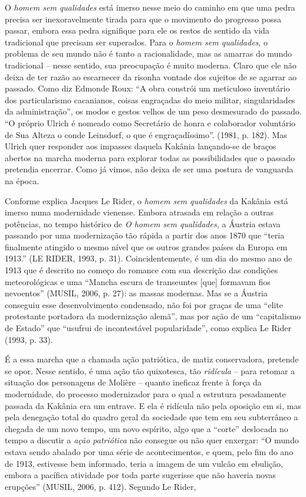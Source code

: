 O \emph{homem sem qualidades} está imerso nesse meio do caminho em que
uma pedra precisa ser inexoravelmente tirada para que o movimento do
progresso possa passar, embora essa pedra signifique para ele os restos
de sentido da vida tradicional que precisam ser superados. Para o
\emph{homem sem qualidades}, o problema de seu mundo não é tanto a
racionalidade, mas as amarras do mundo tradicional -- nesse sentido, sua
preocupação é muito moderna. Claro que ele não deixa de ter razão ao
escarnecer da risonha vontade dos sujeitos de se agarrar ao passado.
Como diz Edmonde Roux: ``A obra constrói um meticuloso inventário dos
particularismo cacanianos, coisas engraçadas do meio militar,
singularidades da administração'', os modos e gestos velhos de um peso
desmesurado do passado. ``O próprio Ulrich é nomeado como Secretário de
honra e colaborador voluntário de Sua Alteza o conde Leinsdorf, o que é
engraçadíssimo''. (1981, p. 182). Mas Ulrich quer responder aos impasses
daquela Kakânia lançando-se de braços abertos na marcha moderna para
explorar todas as possibilidades que o passado pretendia encerrar. Como
já vimos, não deixa de ser uma postura de vanguarda na época.

Conforme explica Jacques Le Rider, o \emph{homem sem qualidades} da
Kakânia está imerso numa modernidade vienense. Embora atrasada em
relação a outras potências, no tempo histórico de \emph{O homem sem
qualidades,} a Áustria estava passando por uma modernização tão rápida a
partir dos anos 1870 que ``teria finalmente atingido o mesmo nível que
os outros grandes países da Europa em 1913.'' (LE RIDER, 1993, p. 31).
Coincidentemente, é um dia do mesmo ano de 1913 que é descrito no começo
do romance com sua descrição das condições meteorológicas e uma ``Mancha
escura de transeuntes {[}que{]} formavam fios nevoentos'' (MUSIL, 2006,
p. 27): as massas modernas. Mas se a Áustria conseguiu esse
desenvolvimento condensado, não foi por graças de uma ``elite
protestante portadora da modernização alemã'', mas por ação de um
``capitalismo de Estado'' que ``usufrui de incontestável popularidade'',
como explica Le Rider (1993, p. 33).

É a essa marcha que a chamada ação patriótica, de matiz conservadora,
pretende se opor. Nesse sentido, é uma ação tão quixotesca, tão
\emph{ridícula} -- para retomar a situação dos personagens de Molière --
quanto ineficaz frente à força da modernidade, do processo modernizador
para o qual a estrutura pesadamente passada da Kakânia era um entrave. E
ela é ridícula não pela oposição em si, mas pela denegação total do
quadro geral da sociedade que tem em seu subterrâneo a chegada de um
novo tempo, um novo espírito, algo que a ``corte'' deslocada no tempo a
discutir a \emph{ação patriótica} não consegue ou não quer enxergar: ``O
mundo estava sendo abalado por uma série de acontecimentos, e quem, pelo
fim do ano de 1913, estivesse bem informado, teria a imagem de um vulcão
em ebulição, embora a pacífica atividade por toda parte sugerisse que
não haveria novas erupções'' (MUSIL, 2006, p. 412). Segundo Le Rider,

